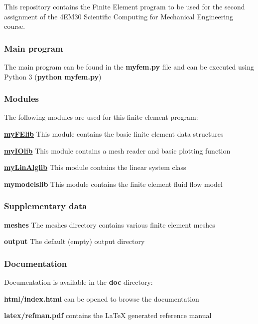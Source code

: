 This repository contains the Finite Element program to be used for the second assignment of the 4\+E\+M30 Scientific Computing for Mechanical Engineering course.

\subsubsection*{Main program}

The main program can be found in the {\bfseries myfem.\+py} file and can be executed using Python 3 ({\bfseries python myfem.\+py})

\subsubsection*{Modules}

The following modules are used for this finite element program\+:
\begin{DoxyItemize}
\item {\bfseries \mbox{\hyperlink{namespacemyFElib}{my\+F\+Elib}}} This module contains the basic finite element data structures
\item {\bfseries \mbox{\hyperlink{namespacemyIOlib}{my\+I\+Olib}}} This module contains a mesh reader and basic plotting function
\item {\bfseries \mbox{\hyperlink{namespacemyLinAlglib}{my\+Lin\+Alglib}}} This module contains the linear system class
\item {\bfseries mymodelslib} This module contains the finite element fluid flow model
\end{DoxyItemize}

\subsubsection*{Supplementary data}


\begin{DoxyItemize}
\item {\bfseries meshes} The meshes directory contains various finite element meshes
\item {\bfseries output} The default (empty) output directory
\end{DoxyItemize}

\subsubsection*{Documentation}

Documentation is available in the {\bfseries doc} directory\+:
\begin{DoxyItemize}
\item {\bfseries html/index.\+html} can be opened to browse the documentation
\item {\bfseries latex/refman.\+pdf} contains the La\+TeX generated reference manual 
\end{DoxyItemize}